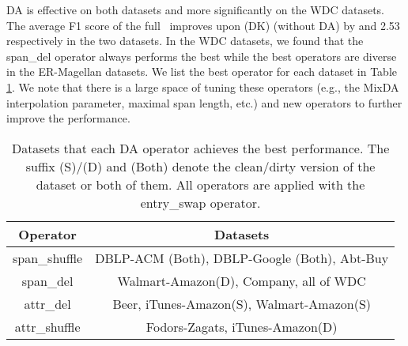 DA is effective on both datasets and more significantly on the WDC datasets.
The average F1 score of the full \system\ improves upon \system(DK) (without DA) by  and 2.53
respectively in the two datasets.
In the WDC datasets, we found that the span\_del operator always performs the best
while the best operators are diverse in the ER-Magellan datasets. We list the best operator for each dataset in Table \ref{tab:bestda}. We note that there is a large space
of tuning these operators
(e.g., the MixDA interpolation parameter, maximal span length, etc.)
and new operators to further improve the performance.


\begin{table}[!htb]
\vspace{-2mm}
\small
\centering
\caption{\small Datasets that each DA operator achieves the best performance.
The suffix (S)/(D) and (Both) denote the clean/dirty version of the dataset or both of them. All operators are applied with the entry\_swap operator.}
 \vspace{-2mm}
\label{tab:bestda}
\begin{tabular}{cc}
\toprule
\textbf{Operator} & \textbf{Datasets} \\ \midrule
span\_shuffle & DBLP-ACM (Both), DBLP-Google (Both), Abt-Buy      \\
span\_del     & Walmart-Amazon(D), Company, all of WDC          \\
attr\_del     & Beer, iTunes-Amazon(S), Walmart-Amazon(S) \\
attr\_shuffle & Fodors-Zagats, iTunes-Amazon(D) \\ \bottomrule
\end{tabular}
\vspace{-2mm}
\end{table}











%
